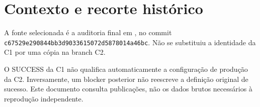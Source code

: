 \section{Contexto e recorte histórico}
A fonte selecionada é a auditoria final em , no commit \nolinkurl{c67529e290844bb3d9033615072d5878014a46bc}. Não se substituiu a identidade da C1 por uma cópia na branch C2. 


O SUCCESS da C1 não qualifica automaticamente a configuração de produção da C2. Inversamente, um blocker posterior não reescreve a definição original de sucesso. Este documento consulta publicações, não os dados brutos necessários à reprodução independente.

